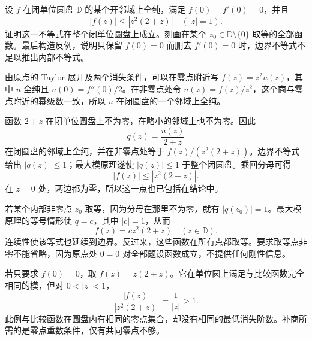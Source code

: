 \begin{exercise}\label{b3:ex:02-6}
设 \(f\) 在闭单位圆盘 \(\overline{\mathbb D}\) 的某个开邻域上全纯，满足 \(f(0)=f'(0)=0\)，并且
\[
  |f(z)|\le|z^2(2+z)|\quad(|z|=1).
\]
证明这一不等式在整个闭单位圆盘上成立。刻画在某个 \(z_0\in\mathbb D\setminus\{0\}\) 取等的全部函数。最后构造反例，说明只保留 \(f(0)=0\) 而删去 \(f'(0)=0\) 时，边界不等式不足以推出内部不等式。
\end{exercise}
\begin{solution}
由原点的 Taylor 展开及两个消失条件，可以在零点附近写
\(f(z)=z^2u(z)\)，其中 \(u\) 全纯且 \(u(0)=f''(0)/2\)。在非零点处令 \(u(z)=f(z)/z^2\)，这个商与零点附近的幂级数一致，所以 \(u\) 在闭圆盘的一个邻域上全纯。

函数 \(2+z\) 在闭单位圆盘上不为零，在略小的邻域上也不为零。因此
\[
  q(z)=\frac{u(z)}{2+z}
\]
在闭圆盘的邻域上全纯，并在非零点处等于 \(f(z)/(z^2(2+z))\)。边界不等式给出 \(|q(z)|\le1\)；最大模原理遂使 \(|q(z)|\le1\) 于整个闭圆盘。乘回分母可得
\[
  |f(z)|\le|z^2(2+z)|.
\]
在 \(z=0\) 处，两边都为零，所以这一点也已包括在结论中。

若某个内部非零点 \(z_0\) 取等，因为分母在那里不为零，就有 \(|q(z_0)|=1\)。最大模原理的等号情形使 \(q=c\)，其中 \(|c|=1\)，从而
\[
  f(z)=c z^2(2+z)\quad(z\in\mathbb D).
\]
连续性使该等式也延续到边界。反过来，这些函数在所有点都取等。要求取等点非零不能省略，因为原点处 \(0=0\) 对全部题设函数成立，不提供任何刚性信息。

若只要求 \(f(0)=0\)，取 \(f(z)=z(2+z)\)。它在单位圆上满足与比较函数完全相同的模，但对 \(0<|z|<1\)，
\[
  \frac{|f(z)|}{|z^2(2+z)|}=\frac1{|z|}>1.
\]
此例与比较函数在圆盘内有相同的零点集合，却没有相同的最低消失阶数。补商所需的是零点重数条件，仅有共同零点不够。
\end{solution}

